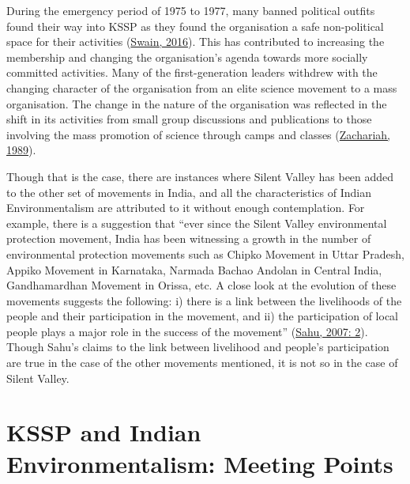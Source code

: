 \documentclass[twoside, 13pt]{article}
\begin{document}
{{During the emergency period of 1975 to 1977, many banned political outfits found their way into KSSP as they found the organisation a safe non-political space for their activities (\underline{Swain, 2016}). This has contributed to increasing the membership and changing the organisation's agenda towards more socially committed activities. Many of the first-generation leaders withdrew with the changing character of the organisation from an elite science movement to a mass organisation. The change in the nature of the organisation was reflected in the shift in its activities from small group discussions and publications to those involving the mass promotion of science through camps and classes (\underline{Zachariah, 1989}).

Though that is the case, there are instances where Silent Valley has been added to the other set of movements in India, and all the characteristics of Indian Environmentalism are attributed to it without enough contemplation. For example, there is a suggestion that “ever since the Silent Valley environmental protection movement, India has been witnessing a growth in the number of environmental protection movements such as Chipko Movement in Uttar Pradesh, Appiko Movement in Karnataka, Narmada Bachao Andolan in Central India, Gandhamardhan Movement in Orissa, etc. A close look at the evolution of these movements suggests the following: i) there is a link between the livelihoods of the people and their participation in the movement, and ii) the participation of local people plays a major role in the success of the movement” (\underline{Sahu, 2007: 2}). Though Sahu’s claims to the link between livelihood and people’s participation are true in the case of the other movements mentioned, it is not so in the case of Silent Valley.}

\vspace{.2cm}

{\fontsize{18}{20}\selectfont\section*{KSSP and Indian Environmentalism: Meeting Points}}

\vspace{-.2cm}

}
\end{document}
